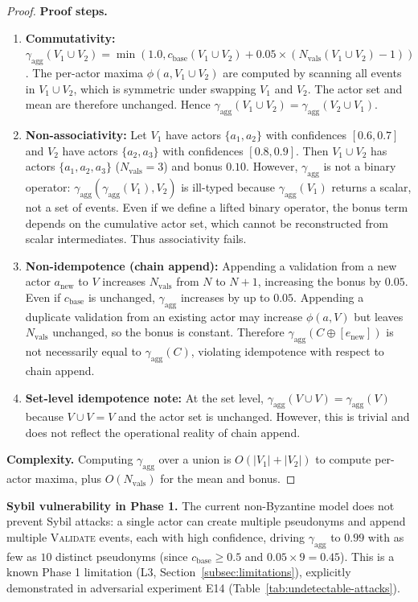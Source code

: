 \begin{proof}
\textbf{Proof steps.}
\begin{enumerate}[label=Step~\arabic*:,leftmargin=2em]
    \item \textbf{Commutativity:} $\gamma_{\text{agg}}(V_1 \cup V_2) = \min(1.0, c_{\text{base}}(V_1 \cup V_2) + 0.05 \times (N_{\text{vals}}(V_1 \cup V_2) - 1))$. The per-actor maxima $\phi(a, V_1 \cup V_2)$ are computed by scanning all events in $V_1 \cup V_2$, which is symmetric under swapping $V_1$ and $V_2$. The actor set and mean are therefore unchanged. Hence $\gamma_{\text{agg}}(V_1 \cup V_2) = \gamma_{\text{agg}}(V_2 \cup V_1)$.
    \item \textbf{Non-associativity:} Let $V_1$ have actors $\{a_1, a_2\}$ with confidences $[0.6, 0.7]$ and $V_2$ have actors $\{a_2, a_3\}$ with confidences $[0.8, 0.9]$. Then $V_1 \cup V_2$ has actors $\{a_1, a_2, a_3\}$ ($N_{\text{vals}} = 3$) and bonus $0.10$. However, $\gamma_{\text{agg}}$ is not a binary operator: $\gamma_{\text{agg}}(\gamma_{\text{agg}}(V_1), V_2)$ is ill-typed because $\gamma_{\text{agg}}(V_1)$ returns a scalar, not a set of events. Even if we define a lifted binary operator, the bonus term depends on the cumulative actor set, which cannot be reconstructed from scalar intermediates. Thus associativity fails.
    \item \textbf{Non-idempotence (chain append):} Appending a validation from a new actor $a_{\text{new}}$ to $V$ increases $N_{\text{vals}}$ from $N$ to $N+1$, increasing the bonus by $0.05$. Even if $c_{\text{base}}$ is unchanged, $\gamma_{\text{agg}}$ increases by up to $0.05$. Appending a duplicate validation from an existing actor may increase $\phi(a, V)$ but leaves $N_{\text{vals}}$ unchanged, so the bonus is constant. Therefore $\gamma_{\text{agg}}(C \oplus [e_{\text{new}}])$ is not necessarily equal to $\gamma_{\text{agg}}(C)$, violating idempotence with respect to chain append.
    \item \textbf{Set-level idempotence note:} At the set level, $\gamma_{\text{agg}}(V \cup V) = \gamma_{\text{agg}}(V)$ because $V \cup V = V$ and the actor set is unchanged. However, this is trivial and does not reflect the operational reality of chain append.
\end{enumerate}

\textbf{Complexity.} Computing $\gamma_{\text{agg}}$ over a union is $O(|V_1| + |V_2|)$ to compute per-actor maxima, plus $O(N_{\text{vals}})$ for the mean and bonus.
\end{proof}

\textbf{Sybil vulnerability in Phase 1.} The current non-Byzantine model does not prevent Sybil attacks: a single actor can create multiple pseudonyms and append multiple \textsc{Validate} events, each with high confidence, driving $\gamma_{\text{agg}}$ to $0.99$ with as few as $10$ distinct pseudonyms (since $c_{\text{base}} \geq 0.5$ and $0.05 \times 9 = 0.45$). This is a known Phase 1 limitation (L3, Section~\ref{subsec:limitations}), explicitly demonstrated in adversarial experiment E14 (Table~\ref{tab:undetectable-attacks}).

